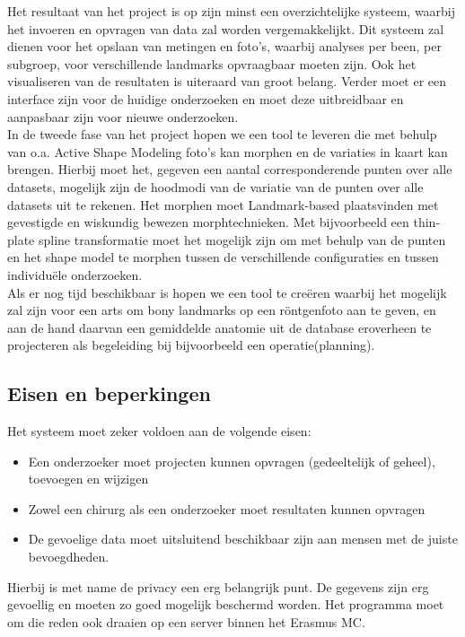 Het resultaat van het project is op zijn minst een overzichtelijke systeem, waarbij het invoeren en opvragen van data zal worden vergemakkelijkt.
Dit systeem zal dienen voor het opslaan van metingen en foto's, waarbij analyses per been, per subgroep, voor verschillende landmarks opvraagbaar moeten zijn.
Ook het visualiseren van de resultaten is uiteraard van groot belang.
Verder moet er een interface zijn voor de huidige onderzoeken en moet deze uitbreidbaar en aanpasbaar zijn voor nieuwe onderzoeken. 
\\
In de tweede fase van het project hopen we een tool te leveren die met behulp van o.a. Active Shape Modeling foto's kan morphen en de variaties in kaart kan brengen.
Hierbij moet het, gegeven een aantal corresponderende punten over alle datasets, mogelijk zijn de hoodmodi van de variatie van de punten over alle datasets uit te rekenen.
Het morphen moet Landmark-based plaatsvinden met gevestigde en wiskundig bewezen morphtechnieken. Met bijvoorbeeld een thin-plate spline transformatie moet het mogelijk zijn om met behulp van de punten en het shape model te morphen tussen de verschillende configuraties en tussen individu\"ele onderzoeken.
\\
Als er nog tijd beschikbaar is hopen we een tool te cre\"eren waarbij het mogelijk zal zijn voor een arts om bony landmarks op een r\"ontgenfoto aan te geven, en aan de hand daarvan een gemiddelde anatomie uit de database eroverheen te projecteren als begeleiding bij bijvoorbeeld een operatie(planning).

\subsection{Eisen en beperkingen}


Het systeem moet zeker voldoen aan de volgende eisen:
\begin{itemize}
  \item Een onderzoeker moet projecten kunnen opvragen (gedeeltelijk of geheel), toevoegen en wijzigen
  \item Zowel een chirurg als een onderzoeker moet resultaten kunnen opvragen
  \item De gevoelige data moet uitsluitend beschikbaar zijn aan mensen met de juiste bevoegdheden.
\end{itemize}
Hierbij is met name de privacy een erg belangrijk punt.
De gegevens zijn erg gevoellig en moeten zo goed mogelijk beschermd worden.
Het programma moet om die reden ook draaien op een server binnen het Erasmus MC.

